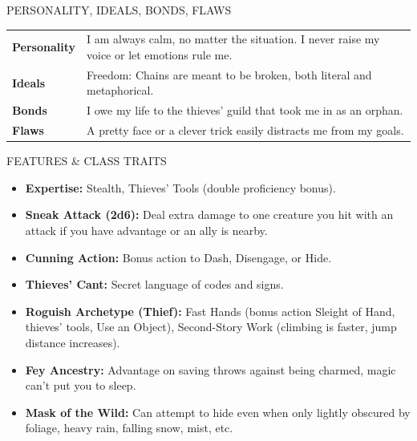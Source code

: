 \documentclass[10pt]{article}
\begin{document}
\begin{minipage}[t]{6.2cm}
  \begin{dndpanel}{PERSONALITY, IDEALS, BONDS, FLAWS}
    \scriptsize
    \renewcommand{\arraystretch}{1.2}
    \begin{tabularx}{\linewidth}{@{}>{\color{accent}\bfseries}l@{\hspace{4mm}}>{\raggedright\arraybackslash}X@{}}
      Personality & I am always calm, no matter the situation. I never raise my voice or let emotions rule me. \\
      Ideals      & Freedom: Chains are meant to be broken, both literal and metaphorical. \\
      Bonds       & I owe my life to the thieves' guild that took me in as an orphan. \\
      Flaws       & A pretty face or a clever trick easily distracts me from my goals. \\
    \end{tabularx}
  \end{dndpanel}
  \vspace{4pt}
  
  \begin{dndpanel}{FEATURES \& CLASS TRAITS}
    \scriptsize
    \begin{itemize}[leftmargin=10pt, noitemsep, topsep=0pt, parsep=2pt]
      \item \textbf{Expertise:} Stealth, Thieves' Tools (double proficiency bonus).
      \item \textbf{Sneak Attack (2d6):} Deal extra damage to one creature you hit with an attack if you have advantage or an ally is nearby.
      \item \textbf{Cunning Action:} Bonus action to Dash, Disengage, or Hide.
      \item \textbf{Thieves' Cant:} Secret language of codes and signs.
      \item \textbf{Roguish Archetype (Thief):} Fast Hands (bonus action Sleight of Hand, thieves' tools, Use an Object), Second-Story Work (climbing is faster, jump distance increases).
      \item \textbf{Fey Ancestry:} Advantage on saving throws against being charmed, magic can't put you to sleep.
      \item \textbf{Mask of the Wild:} Can attempt to hide even when only lightly obscured by foliage, heavy rain, falling snow, mist, etc.
    \end{itemize}
  \end{dndpanel}
  \vspace{4pt}
  

\end{minipage}
\end{document}
